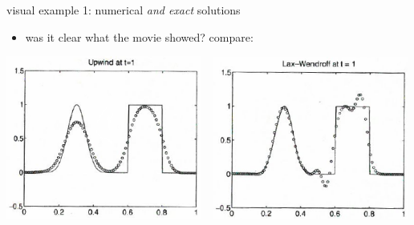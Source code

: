 \documentclass[10pt,hyperref,dvipsnames]{beamer}
\begin{document}
\begin{frame}{visual example 1: numerical \emph{and exact} solutions}

\begin{itemize}
\item was it clear what the movie showed?  compare:
\end{itemize}

\bigskip
\hfill \mbox{\includegraphics[width=0.48\textwidth]{figs/leveque6p1upwind} \, \includegraphics[width=0.48\textwidth]{figs/leveque6p1lw}}
\end{frame}
\end{document}
